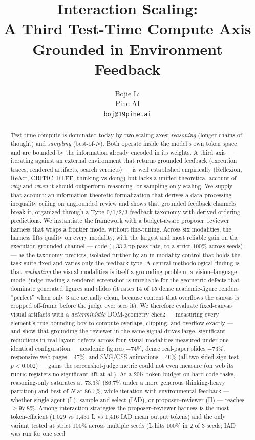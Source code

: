 \documentclass[11pt]{article}
\title{Interaction Scaling:\texorpdfstring{\\}{ }A Third Test-Time Compute Axis Grounded in Environment Feedback}
\author{
  Bojie Li\\
  Pine AI \\
  \texttt{boj@19pine.ai}
}
\date{}
\begin{document}
\maketitle

\begin{abstract}
Test-time compute is dominated today by two scaling axes: \emph{reasoning} (longer chains of thought) and \emph{sampling} (best-of-$N$). Both operate inside the model's own token space and are bounded by the information already encoded in its weights. A third axis --- iterating against an external environment that returns grounded feedback (execution traces, rendered artifacts, search verdicts) --- is well established empirically (Reflexion, ReAct, CRITIC, RLEF, thinking-vs-doing) but lacks a unified theoretical account of \emph{why} and \emph{when} it should outperform reasoning- or sampling-only scaling. We supply that account: an information-theoretic formalization that derives a data-processing-inequality ceiling on ungrounded review and shows that grounded feedback channels break it, organized through a Type 0/1/2/3 feedback taxonomy with derived ordering predictions. We instantiate the framework with a budget-aware proposer--reviewer harness that wraps a frontier model without fine-tuning. Across six modalities, the harness lifts quality on every modality, with the largest and most reliable gain on the execution-grounded channel --- code ($+33.3$\,pp pass-rate, to a strict $100\%$ across seeds) --- as the taxonomy predicts, isolated further by an in-modality control that holds the task suite fixed and varies only the feedback type. A central methodological finding is that \emph{evaluating} the visual modalities is itself a grounding problem: a vision--language-model judge reading a rendered screenshot is unreliable for the geometric defects that dominate generated figures and slides (it rates 14 of 15 dense academic-figure renders ``perfect'' when only 3 are actually clean, because content that overflows the canvas is cropped off-frame before the judge ever sees it). We therefore evaluate fixed-canvas visual artifacts with a \emph{deterministic} DOM-geometry check --- measuring every element's true bounding box to compute overlaps, clipping, and overflow exactly --- and show that grounding the reviewer in the same signal drives large, significant reductions in real layout defects across four visual modalities measured under one identical configuration --- academic figures $-74\%$, dense real-paper slides $-73\%$, responsive web pages $-47\%$, and SVG/CSS animations $-40\%$ (all two-sided sign-test $p<0.002$) --- gains the screenshot-judge metric could not even measure (on web its rubric registers no significant lift at all). At a 20K-token budget on hard code tasks, reasoning-only saturates at 73.3\% (86.7\% under a more generous thinking-heavy partition) and best-of-$N$ at 86.7\%, while iteration with environmental feedback --- whether single-agent (L), sample-and-select (IAD), or proposer--reviewer (H) --- reaches $\geq 97.8\%$. Among interaction strategies the proposer--reviewer harness is the most token-efficient (1{,}029 vs 1{,}431 L vs 1{,}416 IAD mean output tokens) and the only variant tested at strict 100\% across multiple seeds (L hits 100\% in 2 of 3 seeds; IAD was run for one seed 
\end{abstract}
\end{document}
